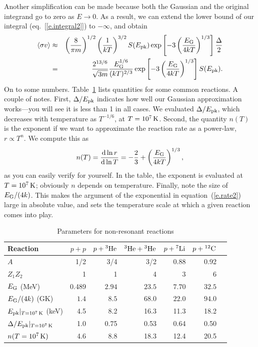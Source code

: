 Another simplification can be made because both the Gaussian and the original integrand go to zero as $E\to 0$.  As a result, we can extend the lower bound of our integral (eq.~[\ref{e.integral2}]) to $-\infty$, and obtain
\begin{eqnarray}\label{e.rate2}
\langle\sigma v\rangle &\approx& \left(\frac{8}{\pi m}\right)^{1/2}\left(\frac{1}{kT}\right)^{3/2} S(\Epk) \exp\left[-3\left(\frac{\EG}{4kT}\right)^{1/3}\right]\frac{\Delta}{2}\nonumber\\
 &=& \frac{2^{13/6}}{\sqrt{3m}}\frac{\EG^{1/6}}{(kT)^{2/3}} \exp\left[-3\left(\frac{\EG}{4kT}\right)^{1/3}\right]  S(\Epk).
\end{eqnarray}
On to some numbers. Table~\ref{t.reaction} lists quantities for some common reactions. A couple of notes. First, $\Delta/\Epk$ indicates how well our Gaussian approximation works---you will see it is less than 1 in all cases. We evaluated $\Delta/\Epk$, which decreases with temperature as $T^{-1/6}$, at $T = 10^{7}\nsp\K$. Second, the quantity $n(T)$ is the exponent if we want to approximate the reaction rate as a power-law, $r\propto T^{n}$.  We compute this as 
\begin{equation}\label{e.exponent}
 n(T) = \frac{\dif\ln r}{\dif\ln T} = -\frac{2}{3} + \left(\frac{\EG}{4kT}\right)^{1/3},
 \end{equation}
 as you can easily verify for yourself. In the table, the exponent is evaluated at $T = 10^{7}\nsp\K$; obviously $n$ depends on temperature. Finally, note the size of $\EG/(4k)$.  This makes the argument of the exponential in equation~(\ref{e.rate2}) large in absolute value, and sets the temperature scale at which a given reaction comes into play.
 
\begin{table}[htbp]
\caption{\label{t.reaction} Parameters for non-resonant reactions}
\begin{center}
\begin{tabular}{lrrrrrr}
\hline
Reaction & $p+p$ & $p+\helium[3]$ & $\helium[3]+\helium[3]$ & $p+\lithium[7]$ & $p+\carbon$\\
\hline\hline
$A$ & 1/2 & 3/4 & 3/2 & 0.88 & 0.92 \\
$Z_{1}Z_{2}$ & 1 & 1 & 4 & 3 & 6 \\
$\EG$ (MeV) & 0.489 & $2.94$ & $23.5$ & $7.70$ & $32.5$\\
$\EG/(4k)$ (GK) & $1.4$ & $8.5$ & $68.0$ & $22.0$ & $94.0$ \\
$\Epk|_{T=10^{7}\nsp\K}$ (keV) & 4.5 & 8.2 & 16.3 & 11.3 & 18.2\\
$\Delta/\Epk|_{T=10^{7}\nsp\K}$ & 1.0 & 0.75 & 0.53 & 0.64 & 0.50 \\
$n(T = 10^{7}\nsp\K)$ & 4.6 & 8.8 & 18.3 & 12.4 & 20.5\\
\hline
\end{tabular}
\end{center}
\end{table}

